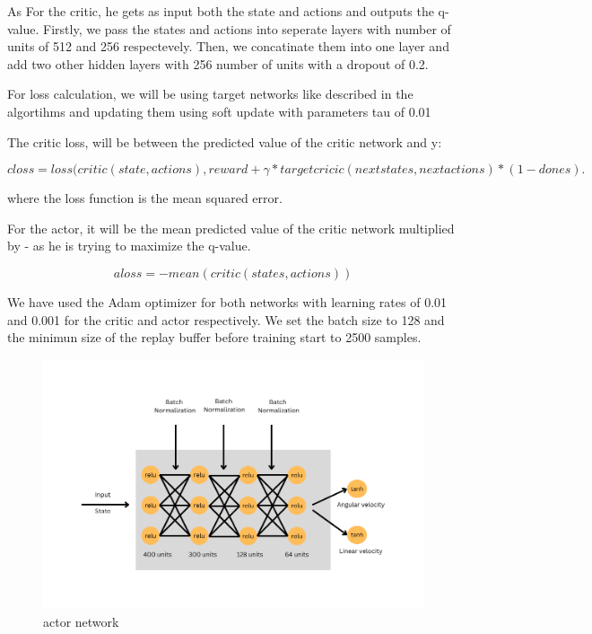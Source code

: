 \documentclass[12pt]{extarticle}
\begin{document}
As For the critic, he gets as input  both the state and actions and outputs the q-value. Firstly, we pass the states and actions into seperate layers 
with number of units of 512 and 256 respectevely. Then, we concatinate them into one layer and add two other hidden layers with 256 number of units with a dropout of 0.2.

For loss calculation, we will be using target networks like described in the algortihms and updating them using soft update with parameters tau of 0.01

The critic loss, will be between the predicted value of the critic network and y:

 

     \begin{equation} \label{critic_loss}
     closs= loss(critic(state,actions),reward+ \gamma*targetcricic(nextstates,nextactions)*(1-dones).
   \end{equation}
 
where the loss function is the mean squared error.

For the actor, it will be the mean predicted value of the critic network multiplied by - as  he is trying to maximize the q-value.

\begin{equation} \label{actor_loss}
     aloss= -mean(critic(states,actions))
   \end{equation}
   
We have used the Adam optimizer for both networks with learning rates of 0.01 and 0.001 for the critic and actor respectively. We set the batch size to 128 and the minimun size of the replay buffer before training start to 2500 samples.

 
   




    
 \begin{figure}[h]  
\centering
\includegraphics[scale=0.65]{actor_net}
\caption[actor network]{actor network}
\end{figure}
\end{document}
